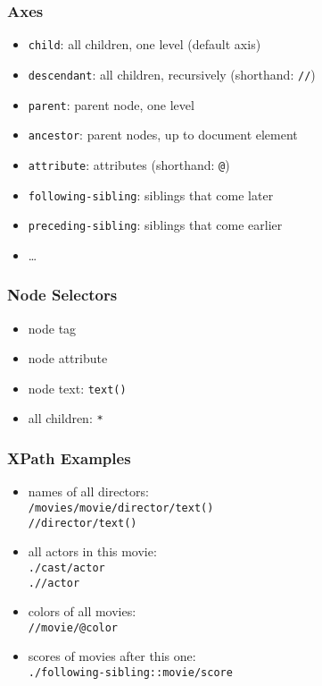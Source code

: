 \documentclass[dvipsnames]{beamer}
\theoremstyle{plain}
\begin{document}
\begin{frame}
  \frametitle{Axes}

  \begin{itemize}
    \item \lstinline|child|:
      all children, one level (default axis)
    \item \lstinline|descendant|:
      all children, recursively (shorthand: \lstinline|//|)
    \item \lstinline|parent|:
      parent node, one level
    \item \lstinline|ancestor|:
      parent nodes, up to document element
    \item \lstinline|attribute|:
      attributes (shorthand: \lstinline|@|)
    \item \lstinline|following-sibling|:
      siblings that come later
    \item \lstinline|preceding-sibling|:
      siblings that come earlier
    \item \ldots
  \end{itemize}
\end{frame}

\begin{frame}
  \frametitle{Node Selectors}

  \begin{itemize}
    \item node tag
    \item node attribute
    \item node text: \lstinline|text()|
    \item all children: \lstinline|*|
  \end{itemize}
\end{frame}

\begin{frame}
  \frametitle{XPath Examples}

  \begin{itemize}
    \item names of all directors:\\
      \lstinline|/movies/movie/director/text()|\\
      \lstinline|//director/text()|

    \pause
    \item all actors in this movie:\\
      \lstinline|./cast/actor|\\
      \lstinline|.//actor|

    \pause
    \item colors of all movies:\\
      \lstinline|//movie/@color|

    \pause
    \item scores of movies after this one:\\
      \lstinline|./following-sibling::movie/score|
  \end{itemize}
\end{frame}
\end{document}
